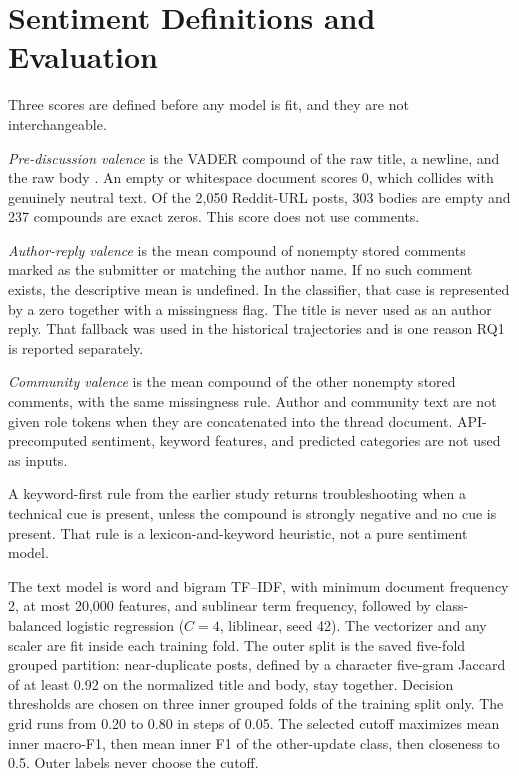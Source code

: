 \documentclass[conference,letterpaper]{IEEEtran}
\begin{document}
\section{Sentiment Definitions and Evaluation}
Three scores are defined before any model is fit, and they are not interchangeable.

\emph{Pre-discussion valence} is the VADER compound of the raw title, a newline, and the raw body \cite{Hutto2014VADER}. An empty or whitespace document scores 0, which collides with genuinely neutral text. Of the 2,050 Reddit-URL posts, 303 bodies are empty and 237 compounds are exact zeros. This score does not use comments.

\emph{Author-reply valence} is the mean compound of nonempty stored comments marked as the submitter or matching the author name. If no such comment exists, the descriptive mean is undefined. In the classifier, that case is represented by a zero together with a missingness flag. The title is never used as an author reply. That fallback was used in the historical trajectories and is one reason RQ1 is reported separately.

\emph{Community valence} is the mean compound of the other nonempty stored comments, with the same missingness rule. Author and community text are not given role tokens when they are concatenated into the thread document. API-precomputed sentiment, keyword features, and predicted categories are not used as inputs.

A keyword-first rule from the earlier study returns troubleshooting when a technical cue is present, unless the compound is strongly negative and no cue is present. That rule is a lexicon-and-keyword heuristic, not a pure sentiment model.

The text model is word and bigram TF--IDF, with minimum document frequency 2, at most 20,000 features, and sublinear term frequency, followed by class-balanced logistic regression ($C=4$, liblinear, seed 42). The vectorizer and any scaler are fit inside each training fold. The outer split is the saved five-fold grouped partition: near-duplicate posts, defined by a character five-gram Jaccard of at least 0.92 on the normalized title and body, stay together. Decision thresholds are chosen on three inner grouped folds of the training split only. The grid runs from 0.20 to 0.80 in steps of 0.05. The selected cutoff maximizes mean inner macro-F1, then mean inner F1 of the other-update class, then closeness to 0.5. Outer labels never choose the cutoff.
\end{document}

